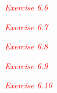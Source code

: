 \textcolor{red}{\textit{Exercise 6.6}}
\begin{adjustwidth}{1cm}{}
\end{adjustwidth}

\textcolor{red}{\textit{Exercise 6.7}}
\begin{adjustwidth}{1cm}{}
\end{adjustwidth}

\textcolor{red}{\textit{Exercise 6.8}}
\begin{adjustwidth}{1cm}{}
\end{adjustwidth}

\textcolor{red}{\textit{Exercise 6.9}}
\begin{adjustwidth}{1cm}{}
\end{adjustwidth}

\textcolor{red}{\textit{Exercise 6.10}}
\begin{adjustwidth}{1cm}{}
\end{adjustwidth}
